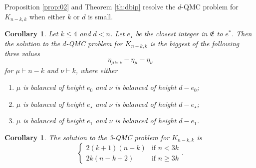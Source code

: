 \documentclass[12pt,dvipsnames,accepted=2016-08-18,a4paper,onecolumn]{quantumarticle}
\numberwithin{equation}{section}
\newtheorem{corollary}[theorem]{Corollary}
\theoremstyle{definition}
\begin{document}
Proposition \ref{prop:02} and Theorem \ref{th:dbip} resolve the $d$-QMC problem for $K_{n-k,k}$ when either $k$ or $d$ is small.

\begin{corollary}\label{cor:dbip}
Let $k\le 4$ and $d<n$. 
Let $e_\star$ be the closest integer in 
$\mathfrak E$ to $e^*$. Then the solution to the $d$-QMC problem for $K_{n-k,k}$ is the biggest of the following three values 
\[\eta_{\mu\uplus\nu}-\eta_\mu-\eta_\nu\]
for $\mu\vdash n-k$ and $\nu\vdash k$, where either
\begin{enumerate}[\rm (a)]
    \item
$\mu$ is balanced of height $e_0$ and $\nu$ is  balanced of height $d-e_0$;
   \item
$\mu$ is balanced of height $e_\star$ and $\nu$ is  balanced of height $d-e_\star$;
   \item
$\mu$ is balanced of height $e_1$ and $\nu$ is  balanced of height $d-e_1$.
\end{enumerate}
\end{corollary}


\begin{corollary}\label{cor:d=3}
The solution to the 3-QMC problem for $K_{n-k,k}$ is
\[
    \begin{cases}
2 ( k +1) (n-k)
& \text{if }n<3k \\
2 k ( n - k + 2)
& \text{if }n\geq 3k
    \end{cases}.
\]
\end{corollary}
\end{document}

